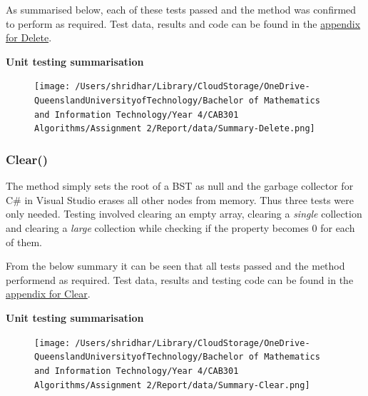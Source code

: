 \documentclass[a4paper]{article}
\begin{document}
\begin{enumerate}
\end{enumerate}
\noindent
\pagebreak

\noindent
As summarised below, each of these tests passed and the method was confirmed to perform as required. Test data, results and code can be found in the \hyperlink{subsubsection.5.2.5}{appendix for Delete}.
\vspace{2mm}

\noindent
\textbf{Unit testing summarisation}
\begin{figure}[H]
   \texttt{[image: /Users/shridhar/Library/CloudStorage/OneDrive-QueenslandUniversityofTechnology/Bachelor of Mathematics and Information Technology/Year 4/CAB301 Algorithms/Assignment 2/Report/data/Summary-Delete.png]}
\end{figure}

\subsubsection{Clear{()}}
The  method simply sets the root of a BST as null and the garbage collector for C\# in Visual Studio erases all other nodes from memory. Thus three tests were only needed. Testing involved clearing an empty array, clearing a \textit{single} collection and clearing a \textit{large} collection while checking if the  property becomes 0 for each of them. 
\vspace{1mm}

\noindent
From the below summary it can be seen that all tests passed and the method performend as required. Test data, results and testing code can be found in the \hyperlink{subsubsection.5.2.6}{appendix for Clear}.
\vspace{2mm}

\noindent
\textbf{Unit testing summarisation}
\begin{figure}[H]
   \texttt{[image: /Users/shridhar/Library/CloudStorage/OneDrive-QueenslandUniversityofTechnology/Bachelor of Mathematics and Information Technology/Year 4/CAB301 Algorithms/Assignment 2/Report/data/Summary-Clear.png]}
\end{figure}
\end{document}

